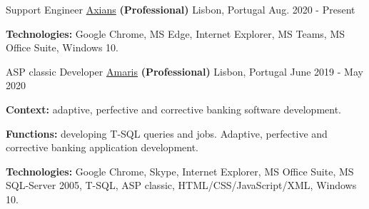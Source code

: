 \begin{cventries}

\vspace{-0.25cm}

  \cventry
    {Support Engineer} %
    {\href{https://www.axians.pt/pt/}{Axians} \textbf{(Professional)}} %
    {Lisbon, Portugal} %
    {Aug. 2020 - Present} %
    {
      \begin{cvitems} %
		\item[] {\textbf{Technologies:} \textcolor{rainbowcolor-olive}{Google Chrome}, \textcolor{rainbowcolor-olive}{MS Edge}, \textcolor{rainbowcolor-olive}{Internet Explorer}, \textcolor{rainbowcolor-olive}{MS Teams}, \textcolor{rainbowcolor-olive}{MS Office Suite}, \textcolor{rainbowcolor-orange}{Windows 10}.}			
      \end{cvitems}		
    } 

  \cventry
    {ASP classic Developer} %
    {\href{https://www.amaris.com/}{Amaris} \textbf{(Professional)}} %
    {Lisbon, Portugal} %
    {June 2019 - May 2020} %
    {
      \begin{cvitems} %
		\item[] {\textbf{Context:} adaptive, perfective and corrective banking software development. 
}
		\item[] {\textbf{Functions:} developing T-SQL queries and jobs. Adaptive, perfective and corrective banking application development.}		
		\item[] {\textbf{Technologies:} \textcolor{rainbowcolor-olive}{Google Chrome}, \textcolor{rainbowcolor-olive}{Skype}, \textcolor{rainbowcolor-olive}{Internet Explorer}, \textcolor{rainbowcolor-olive}{MS Office Suite}, \textcolor{rainbowcolor-olive}{MS SQL-Server 2005}, \textcolor{rainbowcolor-indigo}{T-SQL}, \textcolor{rainbowcolor-indigo}{ASP classic}, \textcolor{rainbowcolor-indigo}{HTML/CSS/JavaScript/XML},  \textcolor{rainbowcolor-orange}{Windows 10}.}		
      \end{cvitems}
    } 
    

\end{cventries}
